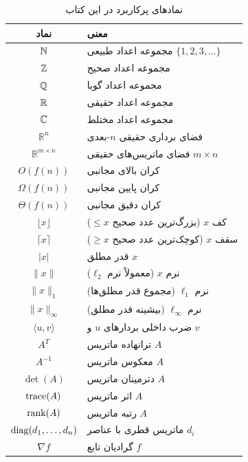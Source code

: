 \documentclass{matinbook}
\begin{document}
    \begin{table}[h]
        \centering
        \caption{نمادهای پرکاربرد در این کتاب}
        \label{tab:notation}
        \begin{tabular}{|c|C{8cm}|}
            \hline
            \textbf{نماد} & \textbf{معنی} \\
            \hline
            $\mathbb{N}$ & مجموعه اعداد طبیعی $\{1, 2, 3, \ldots\}$ \\
            $\mathbb{Z}$ & مجموعه اعداد صحیح \\
            $\mathbb{Q}$ & مجموعه اعداد گویا \\
            $\mathbb{R}$ & مجموعه اعداد حقیقی \\
            $\mathbb{C}$ & مجموعه اعداد مختلط \\
            $\mathbb{R}^{n}$ & فضای برداری حقیقی $n$-بعدی \\
            $\mathbb{R}^{m \times n}$ & فضای ماتریس‌های حقیقی $m \times n$ \\
            $O(f(n))$ & کران بالای مجانبی \\
            $\Omega(f(n))$ & کران پایین مجانبی \\
            $\Theta(f(n))$ & کران دقیق مجانبی \\
            $\lfloor x \rfloor$ & کف $x$ (بزرگ‌ترین عدد صحیح $\leq x$) \\
            $\lceil x \rceil$ & سقف $x$ (کوچک‌ترین عدد صحیح $\geq x$) \\
            $\lvert x \rvert$ & قدر مطلق $x$ \\
            $\|x\|$ & نرم $x$ (معمولاً نرم $\ell_{2}$) \\
            $\|x\|_{1}$ & نرم $\ell_{1}$ (مجموع قدر مطلق‌ها) \\
            $\|x\|_{\infty}$ & نرم $\ell_{\infty}$ (بیشینه قدر مطلق) \\
            $\langle u, v \rangle$ & ضرب داخلی بردارهای $u$ و $v$ \\
            $A^{T}$ & ترانهاده ماتریس $A$ \\
            $A^{-1}$ & معکوس ماتریس $A$ \\
            $\det(A)$ & دترمینان ماتریس $A$ \\
            $\operatorname{trace}(A)$ & اثر ماتریس $A$ \\
            $\operatorname{rank}(A)$ & رتبه ماتریس $A$ \\
            $\operatorname{diag}(d_{1}, \ldots, d_{n})$ & ماتریس قطری با عناصر $d_{i}$ \\
            $\nabla f$ & گرادیان تابع $f$ \\

\end{tabular}
\end{table}
\end{document}
